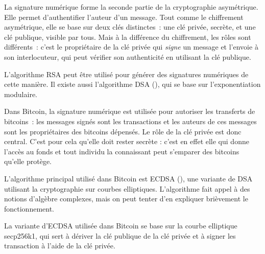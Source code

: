 La signature numérique forme la seconde partie de la cryptographie asymétrique. Elle permet d'authentifier l'auteur d'un message. Tout comme le chiffrement asymétrique, elle se base sur deux clés distinctes~: une clé privée, secrète, et une clé publique, visible par tous. Mais à la différence du chiffrement, les rôles sont différents~: c'est le propriétaire de la clé privée qui \emph{signe} un message et l'envoie à son interlocuteur, qui peut vérifier son authenticité en utilisant la clé publique. 

L'algorithme RSA peut être utilisé pour générer des signatures numériques de cette manière. Il existe aussi l'algorithme DSA (), qui se base sur l'exponentiation modulaire.

Dans Bitcoin, la signature numérique est utilisée pour autoriser les transferts de bitcoins~: les messages signés sont les transactions et les auteurs de ces messages sont les propriétaires des bitcoins dépensés. Le rôle de la clé privée est donc central. C'est pour cela qu'elle doit rester secrète : c'est en effet elle qui donne l'accès au fonds et tout individu la connaissant peut s'emparer des bitcoins qu'elle protège.


L'algorithme principal utilisé dans Bitcoin est ECDSA (), une variante de DSA utilisant la cryptographie sur courbes elliptiques. L'algorithme fait appel à des notions d'algèbre complexes, mais on peut tenter d'en expliquer brièvement le fonctionnement.

La variante d'ECDSA utilisée dans Bitcoin se base sur la courbe elliptique secp256k1, qui sert à dériver la clé publique de la clé privée et à signer les transaction à l'aide de la clé privée.

